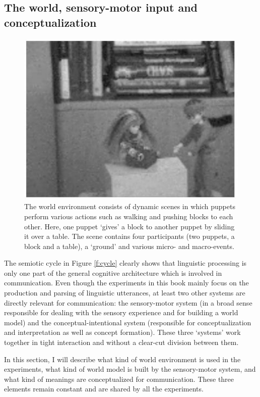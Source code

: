 \subsection{The world, sensory-motor input and conceptualization}
\label{s:world}

\begin{figure}[t]
\centerline{\includegraphics[width=0.65\linewidth]{Chapter3/figs/puppets}}
  \caption[An example scene]{The world environment consists of dynamic scenes in which puppets perform various actions such as walking and pushing blocks to each other. Here, one puppet `gives' a block to another puppet by sliding it over a table. The scene contains four participants (two puppets, a block and a table), a `ground' and various micro- and macro-events.}
   \label{f:puppets}
\end{figure}

The semiotic cycle in Figure \ref{f:cycle} clearly shows that linguistic processing is only one part of the general cognitive architecture which is involved in communication. Even though the experiments in this book mainly focus on the production and parsing of linguistic utterances, at least two other systems are directly relevant for communication: the sensory-motor system (in a broad sense responsible for dealing with the sensory experience and for building a world model) and the conceptual-intentional system (responsible for conceptualization and interpretation as well as concept formation). These three `systems' work together in tight interaction and without a clear-cut division between them.

In this section, I will describe what kind of world environment is used in the experiments, what kind of world model is built by the sensory-motor system, and what kind of meanings are conceptualized for communication. These three elements remain constant and are shared by all the experiments.


